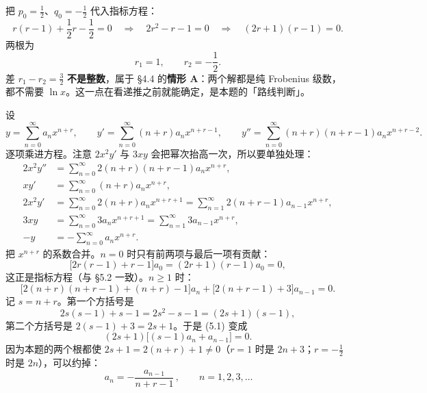 \documentclass[11pt]{ctexart}
\let\origsubhdr\subhdr
\renewcommand{\subhdr}[1]{\needspace{3\baselineskip}\origsubhdr{#1}}
\begin{document}


把 $p_0=\frac12$、$q_0=-\frac12$ 代入指标方程：
\[
r(r-1)+\frac12r-\frac12=0
\quad\Longrightarrow\quad
2r^2-r-1=0
\quad\Longrightarrow\quad
(2r+1)(r-1)=0 .
\]
两根为
\[
r_1=1,\qquad r_2=-\frac12 .
\]
差 $r_1-r_2=\frac32$ \textbf{不是整数}，属于 §4.4 的\textbf{情形 A}：两个解都是纯 Frobenius 级数，都不需要 $\ln x$。这一点在看递推之前就能确定，是本题的「路线判断」。



设
\[
y=\sum_{n=0}^{\infty}a_nx^{n+r},\qquad
y'=\sum_{n=0}^{\infty}(n+r)a_nx^{n+r-1},\qquad
y''=\sum_{n=0}^{\infty}(n+r)(n+r-1)a_nx^{n+r-2}.
\]
逐项乘进方程。注意 $2x^2y'$ 与 $3xy$ 会把幂次抬高一次，所以要单独处理：
\begin{align*}
2x^2y''&=\sum_{n=0}^{\infty}2(n+r)(n+r-1)a_nx^{n+r},\\
xy'&=\sum_{n=0}^{\infty}(n+r)a_nx^{n+r},\\
2x^2y'&=\sum_{n=0}^{\infty}2(n+r)a_nx^{n+r+1}
=\sum_{n=1}^{\infty}2(n+r-1)a_{n-1}x^{n+r},\\
3xy&=\sum_{n=0}^{\infty}3a_nx^{n+r+1}
=\sum_{n=1}^{\infty}3a_{n-1}x^{n+r},\\
-y&=-\sum_{n=0}^{\infty}a_nx^{n+r}.
\end{align*}
把 $x^{n+r}$ 的系数合并。$n=0$ 时只有前两项与最后一项有贡献：
\[
\bigl[2r(r-1)+r-1\bigr]a_0=(2r+1)(r-1)a_0=0,
\]
这正是指标方程（与 §5.2 一致）。$n\geq1$ 时：
\[
\bigl[2(n+r)(n+r-1)+(n+r)-1\bigr]a_n
+\bigl[2(n+r-1)+3\bigr]a_{n-1}=0 . \tag{5.1}
\]
记 $s=n+r$。第一个方括号是
\[
2s(s-1)+s-1=2s^2-s-1=(2s+1)(s-1),
\]
第二个方括号是 $2(s-1)+3=2s+1$。于是 (5.1) 变成
\[
(2s+1)\bigl[(s-1)a_n+a_{n-1}\bigr]=0 . \tag{5.2}
\]
因为本题的两个根都使 $2s+1=2(n+r)+1\neq0$（$r=1$ 时是 $2n+3$；$r=-\frac12$ 时是 $2n$），可以约掉：
\[
\boxed{\,a_n=-\frac{a_{n-1}}{n+r-1}\,},\qquad n=1,2,3,\dots \tag{5.3}
\]

\end{document}

